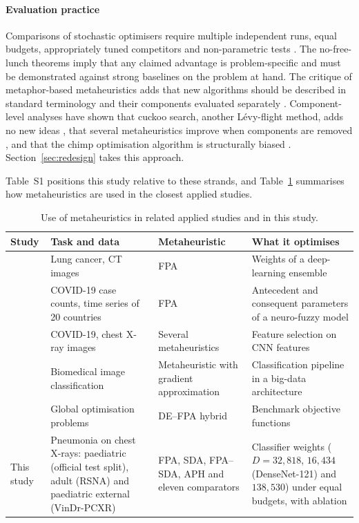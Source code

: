 \documentclass[preprint,12pt]{elsarticle}
\begin{document}
\paragraph{Evaluation practice} Comparisons of stochastic optimisers require multiple independent runs, equal budgets, appropriately tuned competitors and non-parametric tests \citep{derrac2011tutorial,demsar2006,eiben2011parameter}. The no-free-lunch theorems \citep{wolpert1997nfl} imply that any claimed advantage is problem-specific and must be demonstrated against strong baselines on the problem at hand. The critique of metaphor-based metaheuristics \citep{sorensen2015metaphor,camacho2023exposing} adds that new algorithms should be described in standard terminology and their components evaluated separately \citep{lones2020metaphors}. Component-level analyses have shown that cuckoo search, another Lévy-flight method, adds no new ideas \citep{camacho2022cuckoo}, that several metaheuristics improve when components are removed \citep{piotrowski2018simplified}, and that the chimp optimisation algorithm is structurally biased \citep{deng2024chimp}. Section~\ref{sec:redesign} takes this approach.

Table~S1 positions this study relative to these strands, and Table~\ref{tab:related} summarises how metaheuristics are used in the closest applied studies.


\begin{table}[!t]
\centering
\caption{Use of metaheuristics in related applied studies and in this study.}
\label{tab:related}
\footnotesize
\begin{tabular}{>{\raggedright\arraybackslash}p{2.6cm}>{\raggedright\arraybackslash}p{3.3cm}>{\raggedright\arraybackslash}p{2.5cm}>{\raggedright\arraybackslash}p{3.6cm}}
\toprule
Study & Task and data & Metaheuristic & What it optimises \\
\midrule
\citet{zhou2025fpaensemble} & Lung cancer, CT images & FPA & Weights of a deep-learning ensemble \\
\citet{kaya2024fpaanfis} & COVID-19 case counts, time series of 20 countries & FPA & Antecedent and consequent parameters of a neuro-fuzzy model \\
\citet{elkenawy2021} & COVID-19, chest X-ray images & Several metaheuristics & Feature selection on CNN features \\
\citet{almutairi2024} & Biomedical image classification & Metaheuristic with gradient approximation & Classification pipeline in a big-data architecture \\
\citet{song2024defpa} & Global optimisation problems & DE--FPA hybrid & Benchmark objective functions \\
This study & Pneumonia on chest X-rays: paediatric (official test split), adult (RSNA) and paediatric external (VinDr-PCXR) & FPA, SDA, FPA--SDA, APH and eleven comparators & Classifier weights ($D=32{,}818$, $16{,}434$ (DenseNet-121) and $138{,}530$) under equal budgets, with ablation \\
\bottomrule
\end{tabular}
\end{table}
\end{document}
